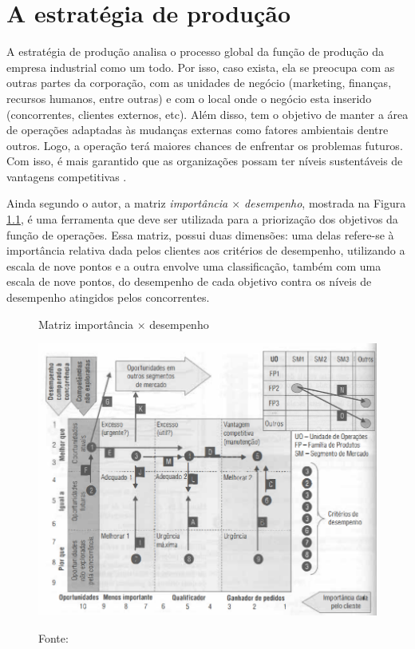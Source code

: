 \chapter{A estratégia de produção}
\label{chap:estrategia_da_producao}

A estratégia de produção analisa o processo global da função de produção da empresa industrial como um todo. Por isso, caso exista, ela se preocupa com as outras partes da corporação, com as unidades de negócio (marketing, finanças, recursos humanos, entre outras) e com o local onde o negócio esta inserido (concorrentes, clientes externos, etc). Além disso, tem o objetivo de manter a área de operações adaptadas às mudanças externas como fatores ambientais dentre outros. Logo, a operação terá maiores chances de enfrentar os problemas futuros. Com isso, é mais garantido que as organizações possam ter níveis sustentáveis de vantagens competitivas \cite{correa2000administracao}.

Ainda segundo o autor, a matriz \textit{importância $\times$ desempenho}, mostrada na Figura \ref{fig:matriz_importancia_desempenho}, é uma ferramenta que deve ser utilizada para a priorização dos objetivos da função de operações. Essa matriz, possui duas dimensões: uma delas refere-se à importância relativa dada pelos clientes aos critérios de desempenho, utilizando a escala de nove pontos e a outra envolve uma classificação, também com uma escala de nove pontos, do desempenho de cada objetivo contra os níveis de desempenho atingidos pelos concorrentes.

\begin{figure}[H]
  \centering
  \caption{Matriz importância $\times$ desempenho}
  \includegraphics[width =.9\textwidth]{images/impor_desem.png}
  \label{fig:matriz_importancia_desempenho}
  \caption*{Fonte: \cite{correa2000administracao}}
\end{figure}

